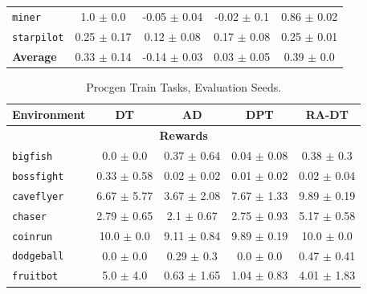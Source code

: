 \documentclass{article}
\begin{document}
\begin{table}[h]
\begin{tabular}{@{} l c c c c@{}}
    \texttt{miner}              &                    1.0 $\pm$ 0.0 &                  -0.05 $\pm$ 0.04 &                   -0.02 $\pm$ 0.1 &            0.86 $\pm$ 0.02 \\
    \texttt{starpilot}          &                  0.25 $\pm$ 0.17 &                   0.12 $\pm$ 0.08 &                   0.17 $\pm$ 0.08 &            0.25 $\pm$ 0.01 \\
    \textbf{Average}           &                       0.33 $\pm$ 0.14 &                  -0.14 $\pm$ 0.03 &                   0.03 $\pm$ 0.05 &             0.39 $\pm$ 0.0 \\
    \bottomrule
\end{tabular}
\label{tab:procgen-train-train}
\end{table}
\begin{table}[h]
    \centering
    \caption{Procgen Train Tasks, Evaluation Seeds.}
    \begin{tabular}{@{} l c c c c@{}}
    \toprule
    \textbf{Environment} & \textbf{DT} & \textbf{AD} & \textbf{DPT} & \textbf{RA-DT} \\ \midrule
    \multicolumn{5}{c}{\textbf{Rewards}} \\
    \texttt{bigfish}    &                    0.0 $\pm$ 0.0 &                   0.37 $\pm$ 0.64 &                   0.04 $\pm$ 0.08 &              0.38 $\pm$ 0.3 \\
    \texttt{bossfight}  &                  0.33 $\pm$ 0.58 &                   0.02 $\pm$ 0.02 &                   0.01 $\pm$ 0.02 &             0.02 $\pm$ 0.04 \\
    \texttt{caveflyer}  &                  6.67 $\pm$ 5.77 &                   3.67 $\pm$ 2.08 &                   7.67 $\pm$ 1.33 &             9.89 $\pm$ 0.19 \\
    \texttt{chaser}     &                  2.79 $\pm$ 0.65 &                    2.1 $\pm$ 0.67 &                   2.75 $\pm$ 0.93 &             5.17 $\pm$ 0.58 \\
    \texttt{coinrun}    &                   10.0 $\pm$ 0.0 &                   9.11 $\pm$ 0.84 &                   9.89 $\pm$ 0.19 &              10.0 $\pm$ 0.0 \\
    \texttt{dodgeball}  &                    0.0 $\pm$ 0.0 &                    0.29 $\pm$ 0.3 &                     0.0 $\pm$ 0.0 &             0.47 $\pm$ 0.41 \\
    \texttt{fruitbot}   &                    5.0 $\pm$ 4.0 &                   0.63 $\pm$ 1.65 &                   1.04 $\pm$ 0.83 &             4.01 $\pm$ 1.83 \\

\end{tabular}
\end{table}
\end{document}
